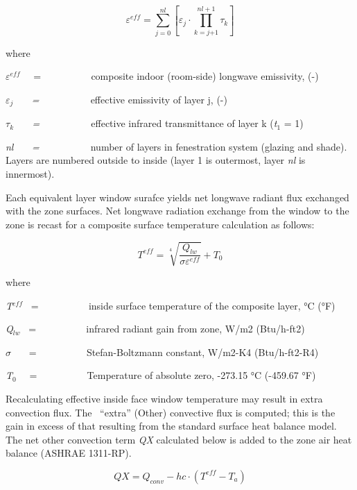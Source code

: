 \begin{equation}
{\varepsilon ^{eff}} = \sum\limits_{j = 0}^{nl} {\left[ {{\varepsilon_j} \cdot \prod\limits_{k = j{ + 1}}^{nl + {1}} {{\tau_k}} } \right]}
\end{equation}

where

\emph{$\varepsilon$\(^{eff}\)}~~ = ~~~~~~~~~ composite indoor (room-side) longwave emissivity, (-)

\emph{$\varepsilon$\(_{j}\)~~~ = ~~~~~~~~~} effective emissivity of layer j, (-)

\emph{$\tau$\(_{k}\)~~~ = ~~~~~~~~~} effective infrared transmittance of layer k (\emph{t\(_{1}\)} = 1)

\emph{nl~~~ = ~~~~~~~~~} number of layers in fenestration system (glazing and shade). Layers are numbered outside to inside (layer 1 is outermost, layer \emph{nl} is innermost).

Each equivalent layer window surafce yields net longwave radiant flux exchanged with the zone surfaces. Net longwave radiation exchange from the window to the zone is recast for a composite surface temperature calculation as follows:

\begin{equation}
{T^{eff}} = \sqrt[4]{{\frac{{{Q_{lw}}}}{{\sigma {\varepsilon ^{eff}}}}}} + {T_0}
\end{equation}

where

\emph{T\(^{eff}\)}~ = ~~~~~~~~~ inside surface temperature of the composite layer, °C (°F)

\emph{Q\(_{lw}\)}~ = ~~~~~~~~~ infrared radiant gain from zone, W/m2 (Btu/h-ft2)

\emph{$\sigma$}~~~ = ~~~~~~~~~ Stefan-Boltzmann constant, W/m2-K4 (Btu/h-ft2-R4)

\emph{T\(_{0}\)}~~ = ~~~~~~~~~ Temperature of absolute zero, -273.15 °C (-459.67 °F)

Recalculating effective inside face window temperature may result in extra convection flux. The~ ``extra'' (Other) convective flux is computed; this is the gain in excess of that resulting from the standard surface heat balance model. The net other convection term \emph{QX} calculated below is added to the zone air heat balance (ASHRAE 1311-RP).

\begin{equation}
QX = {Q_{conv}} - hc \cdot ({T^{eff}} - {T_a})
\end{equation}

